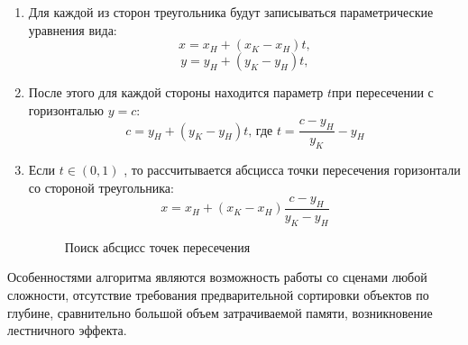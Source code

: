 \begin{enumerate}
	\item Для каждой из сторон треугольника будут записываться параметрические
уравнения вида:
	\begin{equation}
		x = x_H + (x_K - x_H)t,
	\end{equation}
	\begin{equation}
		y = y_H + (y_K - y_H)t,
	\end{equation}
	\item После этого для каждой стороны находится параметр \begin{math} t \end{math}при пересечении с горизонталью \begin{math} y = c\end{math}:
	\begin{equation}
		c = y_H + (y_K - y_H)t
	\text{, где } 
		t = \frac{
		c - y_H
  		}{
  		y_K
		} - y_H
	\end{equation}
	\item Если \begin{math} t \in (0, 1)\end{math} , то рассчитывается абсцисса точки
пересечения горизонтали со стороной треугольника:
	\begin{equation}
		x = x_H + (x_K - x_H) \frac{
		c - y_H
  		}{
  		y_K - y_H
		}
	\end{equation}
	\begin{figure}[h!]
		\caption{Поиск абсцисс точек пересечения}
		\label{ris:image_z}
	\end{figure}
\end{enumerate}
\par Особенностями алгоритма являются возможность работы со сценами любой сложности, отсутствие требования предварительной сортировки объектов по глубине, сравнительно большой объем затрачиваемой памяти, возникновение лестничного эффекта.

